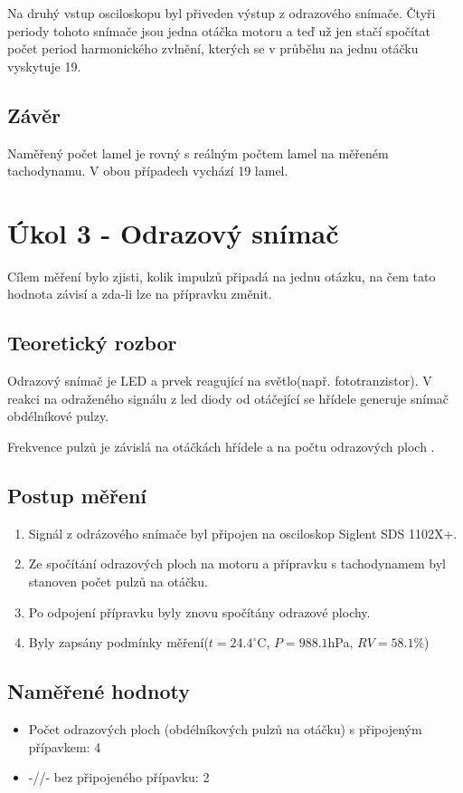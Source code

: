 \documentclass{protokol}
\begin{document}
        Na druhý vstup osciloskopu byl přiveden výstup z odrazového snímače. Čtyři periody tohoto snímače jsou jedna otáčka motoru a teď už jen stačí spočítat počet period harmonického zvlnění, kterých se v průběhu na jednu otáčku vyskytuje 19.

   
    \subsection{Závěr}
        Naměřený počet lamel je rovný s reálným počtem lamel na měřeném tachodynamu. V obou případech vychází 19 lamel.

\pagebreak

\section{Úkol 3 - Odrazový snímač}
    Cílem měření bylo zjisti, kolik impulzů připadá na jednu otázku, na čem tato hodnota závisí a zda-li lze na přípravku změnit.
    \subsection{Teoretický rozbor}
        Odrazový snímač je LED a prvek reagující na světlo(např. fototranzistor)\cite{navod}. V reakci na odraženého signálu z led diody od otáčející se hřídele generuje snímač obdélníkové pulzy.

        Frekvence pulzů je závislá na otáčkách hřídele a na počtu odrazových ploch \cite{navod}.

    \subsection{Postup měření}
        \begin{enumerate}
            \item Signál z odrázového snímače byl připojen na osciloskop Siglent SDS 1102X+.
            \item Ze spočítání odrazových ploch na motoru a přípravku s tachodynamem byl stanoven počet pulzů na otáčku.
            \item Po odpojení přípravku byly znovu spočítány odrazové plochy.
            \item Byly zapsány podmínky měření($t = 24.4 ^\circ$C, $P = 988.1$hPa, $RV = 58.1 \%$)
        \end{enumerate}
    \subsection{Naměřené hodnoty}
        \begin{itemize}
            \item Počet odrazových ploch (obdélníkových pulzů na otáčku) s připojeným přípavkem: 4
            \item -//- bez připojeného přípavku: 2
        \end{itemize}
\end{document}
